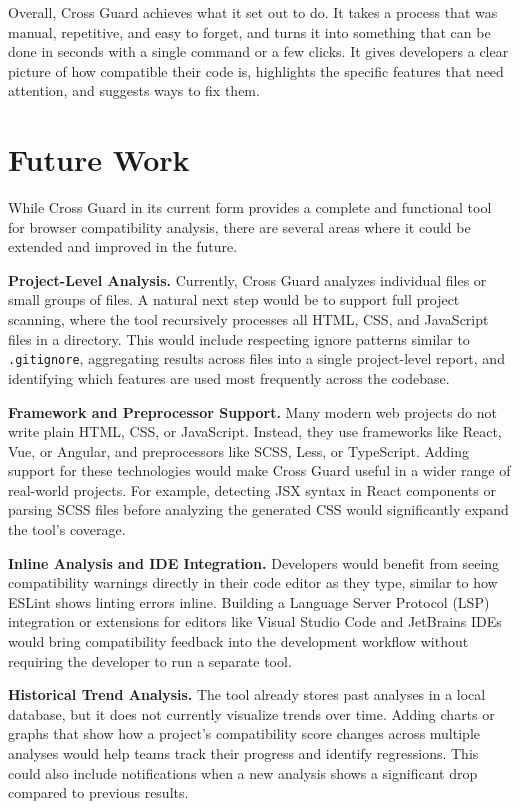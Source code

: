 Overall, Cross Guard achieves what it set out to do. It takes a process that was manual, repetitive, and easy to forget, and turns it into something that can be done in seconds with a single command or a few clicks. It gives developers a clear picture of how compatible their code is, highlights the specific features that need attention, and suggests ways to fix them.

\section{Future Work}
\label{sec:future}

While Cross Guard in its current form provides a complete and functional tool for browser compatibility analysis, there are several areas where it could be extended and improved in the future.

\textbf{Project-Level Analysis.} Currently, Cross Guard analyzes individual files or small groups of files. A natural next step would be to support full project scanning, where the tool recursively processes all HTML, CSS, and JavaScript files in a directory. This would include respecting ignore patterns similar to \texttt{.gitignore}, aggregating results across files into a single project-level report, and identifying which features are used most frequently across the codebase.

\textbf{Framework and Preprocessor Support.} Many modern web projects do not write plain HTML, CSS, or JavaScript. Instead, they use frameworks like React, Vue, or Angular, and preprocessors like SCSS, Less, or TypeScript. Adding support for these technologies would make Cross Guard useful in a wider range of real-world projects. For example, detecting JSX syntax in React components or parsing SCSS files before analyzing the generated CSS would significantly expand the tool's coverage.

\textbf{Inline Analysis and IDE Integration.} Developers would benefit from seeing compatibility warnings directly in their code editor as they type, similar to how ESLint shows linting errors inline. Building a Language Server Protocol (LSP) integration or extensions for editors like Visual Studio Code and JetBrains IDEs would bring compatibility feedback into the development workflow without requiring the developer to run a separate tool.

\textbf{Historical Trend Analysis.} The tool already stores past analyses in a local database, but it does not currently visualize trends over time. Adding charts or graphs that show how a project's compatibility score changes across multiple analyses would help teams track their progress and identify regressions. This could also include notifications when a new analysis shows a significant drop compared to previous results.

